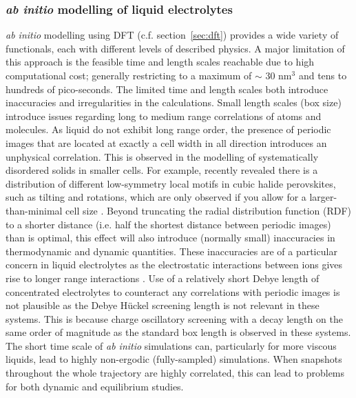 \documentclass[../main.tex]{subfiles}
\begin{document}
\subsubsection{\textit{ab initio} modelling of liquid electrolytes}
\textit{ab initio} modelling using DFT (c.f. section~\ref{sec:dft}) provides a wide variety of functionals, each with different levels of described physics. A major limitation of this approach is the feasible time and length scales reachable due to high computational cost; generally restricting to a maximum of $\sim$ 30 nm$^3$ and tens to hundreds of pico-seconds. The limited time and length scales both introduce inaccuracies and irregularities in the calculations. Small length scales (box size) introduce issues regarding long to medium range correlations of atoms and molecules. As liquid do not exhibit long range order, the presence of periodic images that are located at exactly a cell width in all direction introduces an unphysical correlation. This is observed in the modelling of systematically disordered solids in smaller cells\cite{Morgan_2011}. For example, \citeauthor{Zhao_2020} recently revealed there is a distribution of different low-symmetry local motifs in cubic halide perovskites, such as tilting and rotations, which are only observed if you allow for a larger-than-minimal cell size \cite{Zhao_2020}. Beyond truncating the radial distribution function (RDF) to a shorter distance (i.e. half the shortest distance between periodic images) than is optimal, this effect will also introduce (normally small) inaccuracies in thermodynamic and dynamic quantities\cite{Binder2009book, yeh_system-size_2004,botan_diffusion_2015,horbach_finite_1996}. These inaccuracies are of a particular concern in liquid electrolytes as the electrostatic interactions between ions gives rise to longer range interactions \cite{coles_correlation_2020}. Use of a relatively short Debye length of concentrated electrolytes to counteract any correlations with periodic images is not plausible as the Debye H\"{u}ckel screening length is not relevant in these systems. This is because charge oscillatory screening with a decay length on the same order of magnitude as the standard box length is observed in these systems\cite{coles_correlation_2020}. The short time scale of \textit{ab initio} simulations can, particularly for more viscous liquids, lead to highly non-ergodic (fully-sampled) simulations. When snapshots throughout the whole trajectory are highly correlated\cite{frenkel_understanding_2002}, this can lead to problems for both dynamic and equilibrium studies. 
\end{document}
